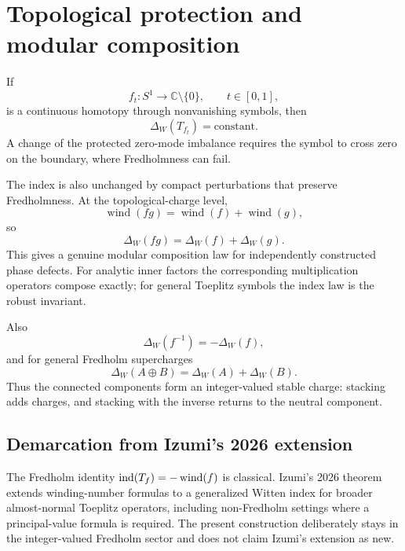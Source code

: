 \section{Topological protection and modular composition}

\begin{proposition}\label{prop:homotopy}
If
\[
f_t:S^1\to\mathbb C\setminus\{0\},
\qquad t\in[0,1],
\]
is a continuous homotopy through nonvanishing symbols, then
\[
\boxed{
\Delta_W(T_{f_t})=\text{constant}.
}
\]
A change of the protected zero-mode imbalance requires the symbol to cross zero on the boundary, where Fredholmness can fail.
\end{proposition}

The index is also unchanged by compact perturbations that preserve Fredholmness. At the topological-charge level,
\[
\operatorname{wind}(fg)
=
\operatorname{wind}(f)+\operatorname{wind}(g),
\]
so
\[
\boxed{
\Delta_W(fg)
=
\Delta_W(f)+\Delta_W(g).
}
\]
This gives a genuine modular composition law for independently constructed phase defects. For analytic inner factors the corresponding multiplication operators compose exactly; for general Toeplitz symbols the index law is the robust invariant.

Also
\[
\boxed{
\Delta_W(f^{-1})=-\Delta_W(f),
}
\]
and for general Fredholm supercharges
\[
\boxed{
\Delta_W(A\oplus B)
=
\Delta_W(A)+\Delta_W(B).
}
\]
Thus the connected components form an integer-valued stable charge: stacking adds charges, and stacking with the inverse returns to the neutral component.

\subsection{Demarcation from Izumi's 2026 extension}

The Fredholm identity $\operatorname{ind}(T_f)=-\operatorname{wind}(f)$ is classical. Izumi's 2026 theorem extends winding-number formulas to a generalized Witten index for broader almost-normal Toeplitz operators, including non-Fredholm settings where a principal-value formula is required. The present construction deliberately stays in the integer-valued Fredholm sector and does not claim Izumi's extension as new.
